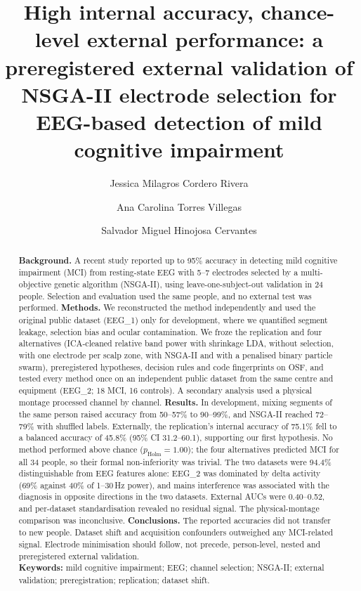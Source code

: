 \documentclass[11pt,letterpaper]{article}
\title{\bfseries High internal accuracy, chance-level external performance: a preregistered external validation of NSGA-II electrode selection for EEG-based detection of mild cognitive impairment}
\author[1]{Jessica Milagros Cordero Rivera}
\author[1,*]{Ana Carolina Torres Villegas}
\author[1]{Salvador Miguel Hinojosa Cervantes}
\affil[1]{Tecnológico de Monterrey, Campus Guadalajara, Zapopan, Jalisco, Mexico}
\affil[*]{Corresponding author: \href{mailto:torresvillegasanacarolina@gmail.com}{torresvillegasanacarolina@gmail.com}}
\date{}
\begin{document}
\maketitle

\begin{abstract}
\noindent\textbf{Background.} A recent study reported up to 95\% accuracy in detecting mild cognitive impairment (MCI) from resting-state EEG with 5--7 electrodes selected by a multi-objective genetic algorithm (NSGA-II), using leave-one-subject-out validation in 24 people. Selection and evaluation used the same people, and no external test was performed.
\textbf{Methods.} We reconstructed the method independently and used the original public dataset (EEG\_1) only for development, where we quantified segment leakage, selection bias and ocular contamination. We froze the replication and four alternatives (ICA-cleaned relative band power with shrinkage LDA, without selection, with one electrode per scalp zone, with NSGA-II and with a penalised binary particle swarm), preregistered hypotheses, decision rules and code fingerprints on OSF, and tested every method once on an independent public dataset from the same centre and equipment (EEG\_2; 18 MCI, 16 controls). A secondary analysis used a physical montage processed channel by channel.
\textbf{Results.} In development, mixing segments of the same person raised accuracy from 50--57\% to 90--99\%, and NSGA-II reached 72--79\% with shuffled labels. Externally, the replication's internal accuracy of 75.1\% fell to a balanced accuracy of 45.8\% (95\% CI 31.2--60.1), supporting our first hypothesis. No method performed above chance ($p_\text{Holm}=1.00$); the four alternatives predicted MCI for all 34 people, so their formal non-inferiority was trivial. The two datasets were 94.4\% distinguishable from EEG features alone: EEG\_2 was dominated by delta activity (69\% against 40\% of 1--30\,Hz power), and mains interference was associated with the diagnosis in opposite directions in the two datasets. External AUCs were 0.40--0.52, and per-dataset standardisation revealed no residual signal. The physical-montage comparison was inconclusive.
\textbf{Conclusions.} The reported accuracies did not transfer to new people. Dataset shift and acquisition confounders outweighed any MCI-related signal. Electrode minimisation should follow, not precede, person-level, nested and preregistered external validation.\\[4pt]
\noindent\textbf{Keywords:} mild cognitive impairment; EEG; channel selection; NSGA-II; external validation; preregistration; replication; dataset shift.
\end{abstract}
\end{document}
